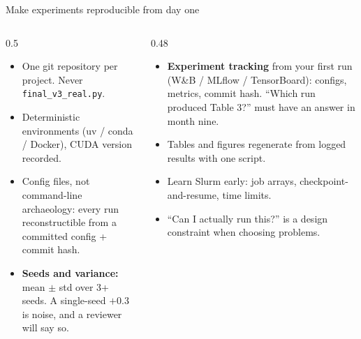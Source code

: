 \documentclass[aspectratio=169,11pt]{beamer}
\newcommand{\code}[1]{\texttt{\small #1}}
\newcommand{\key}[1]{\textbf{\color{brand}#1}}
\begin{document}
\begin{frame}{Make experiments reproducible from day one}
\begin{columns}[T]
\begin{column}{0.5\textwidth}
\footnotesize
\begin{itemize}
  \item One git repository per project. Never \code{final\_v3\_real.py}.
  \item Deterministic environments (uv / conda / Docker), CUDA version
        recorded.
  \item Config files, not command-line archaeology: every run reconstructible
        from a committed config + commit hash.
  \item \key{Seeds and variance:} mean $\pm$ std over 3+ seeds. A single-seed
        $+0.3$ is noise, and a reviewer will say so.
\end{itemize}
\end{column}
\begin{column}{0.48\textwidth}
\footnotesize
\begin{itemize}
  \item \key{Experiment tracking} from your first run (W\&B / MLflow /
        TensorBoard): configs, metrics, commit hash. ``Which run produced
        Table 3?'' must have an answer in month nine.
  \item Tables and figures regenerate from logged results with one script.
  \item Learn Slurm early: job arrays, checkpoint-and-resume, time limits.
  \item ``Can I actually run this?'' is a design constraint when choosing
        problems.
\end{itemize}
\end{column}
\end{columns}
\end{frame}
\end{document}
